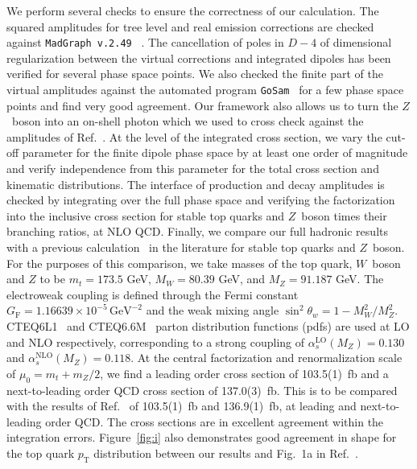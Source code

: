 \documentclass{JHEP3}
\newcommand{\GeV}{\mathrm{GeV}}
\begin{document}
We perform several checks to ensure the correctness of our calculation. 
The squared amplitudes for tree level and real emission corrections are checked against {\tt MadGraph v.2.49} ~\cite{Stelzer:1994ta}. 
The cancellation of poles in $D-4$ of dimensional regularization between the virtual corrections and integrated dipoles has been verified for several phase space points.
We also checked the finite part of the virtual amplitudes against the automated program {\tt GoSam}~\cite{Cullen:2011ac} for a few phase space points and find
very good agreement. 
Our framework also allows us 
to turn the $Z$~boson into an on-shell photon which we used to cross check against the amplitudes of Ref.~\cite{Melnikov:2011ta}. 
At the level of the integrated cross section, we vary the cut-off parameter for the finite dipole phase space by at least one order of magnitude and 
verify independence from this parameter for the total cross section and kinematic distributions.
The interface of production and decay amplitudes is checked by integrating over the full phase space and verifying the factorization into the 
inclusive cross section for stable top quarks and $Z$~boson times their branching ratios, at NLO QCD.
Finally, we compare our full hadronic results with a previous calculation~\cite{Garzelli:2012bn} in the literature for stable top quarks and $Z$~boson.
For the purposes of this comparison, we take masses of the top quark, $W$~boson and $Z$ to be $m_t=173.5$ GeV, $M_W=80.39$ GeV, and $M_Z=91.187$ GeV. 
The electroweak coupling is defined through the Fermi constant $G_\mathrm{F}=1.16639 \times 10^{-5} \, \GeV^{-2}$ and the weak mixing angle $\sin^2\theta_w = 1-M_W^2/M_Z^2$. 
CTEQ6L1~\cite{Pumplin:2002vw} and CTEQ6.6M~\cite{Nadolsky:2008zw} parton distribution functions (pdfs) are used at LO and NLO respectively, corresponding to a strong coupling of $\alpha_s^{\mathrm{LO}}(M_Z)=0.130$ and $\alpha_s^{\mathrm{NLO}}(M_Z)=0.118$. 
At the central factorization and renormalization scale of $\mu_0=m_t+m_Z/2$, 
we find a leading order cross section of 103.5(1)~fb and a next-to-leading order QCD cross section of 137.0(3)~fb. 
This is to be compared with the results of Ref.~\cite{Garzelli:2012bn} of 103.5(1)~fb and 136.9(1)~fb, at leading and next-to-leading order QCD.
The cross sections are in excellent agreement within the integration errors.
Figure~\ref{fig:i} also demonstrates good agreement in shape for the top quark $p_{\mathrm{T}}$ distribution between our results and Fig.~1a in Ref.~\cite{Garzelli:2012bn}.
\end{document}
